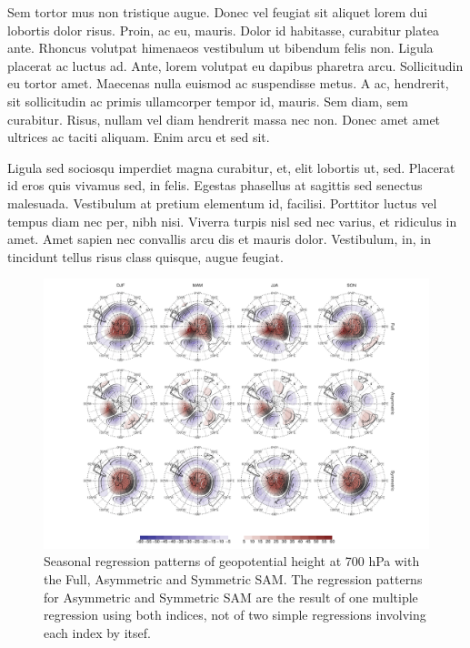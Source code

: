 \documentclass[]{ametsocV5}
\begin{document}
Sem tortor mus non tristique augue. Donec vel feugiat sit aliquet lorem
dui lobortis dolor risus. Proin, ac eu, mauris. Dolor id habitasse,
curabitur platea ante. Rhoncus volutpat himenaeos vestibulum ut bibendum
felis non. Ligula placerat ac luctus ad. Ante, lorem volutpat eu dapibus
pharetra arcu. Sollicitudin eu tortor amet. Maecenas nulla euismod ac
suspendisse metus. A ac, hendrerit, sit sollicitudin ac primis
ullamcorper tempor id, mauris. Sem diam, sem curabitur. Risus, nullam
vel diam hendrerit massa nec non. Donec amet amet ultrices ac taciti
aliquam. Enim arcu et sed sit.

Ligula sed sociosqu imperdiet magna curabitur, et, elit lobortis ut,
sed. Placerat id eros quis vivamus sed, in felis. Egestas phasellus at
sagittis sed senectus malesuada. Vestibulum at pretium elementum id,
facilisi. Porttitor luctus vel tempus diam nec per, nibh nisi. Viverra
turpis nisl sed nec varius, et ridiculus in amet. Amet sapien nec
convallis arcu dis et mauris dolor. Vestibulum, in, in tincidunt tellus
risus class quisque, augue feugiat.

\begin{figure}
\includegraphics{2d-regr-700-1} \caption[Seasonal regression patterns of geopotential height at 700 hPa with the Full, Asymmetric and Symmetric SAM]{Seasonal regression patterns of geopotential height at 700 hPa with the Full, Asymmetric and Symmetric SAM. The regression patterns for Asymmetric and Symmetric SAM are the result of one multiple regression using both indices, not of two simple regressions involving each index by itsef.}\label{fig:2d-regr-700}
\end{figure}
\end{document}
